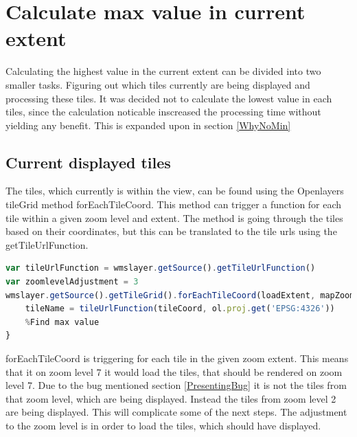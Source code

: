 \section{Calculate max value in current extent}
Calculating the highest value in the current extent can be divided into two smaller tasks. Figuring out which tiles currently are being displayed and processing these tiles. It was decided not to calculate the lowest value in each tiles, since the calculation noticable inscreased the processing time without yielding any benefit. This is expanded upon in section \ref{WhyNoMin}

\subsection{Current displayed tiles}

The tiles, which currently is within the view, can be found using the Openlayers tileGrid method forEachTileCoord. This method can trigger a function for each tile within a given zoom level and extent. 
\citep{forEachTileCoord}
The method is going through the tiles based on their coordinates, but this can be translated to the tile urls using the getTileUrlFunction.
\begin{lstlisting}[language=JavaScript, caption={The JavaScript in the project}, label= VoresJS,escapechar=|]
var tileUrlFunction = wmslayer.getSource().getTileUrlFunction()
var zoomlevelAdjustment = 3
wmslayer.getSource().getTileGrid().forEachTileCoord(loadExtent, mapZoom - zoomlevelAdjustment, function(tileCoord) {
	tileName = tileUrlFunction(tileCoord, ol.proj.get('EPSG:4326'))
	%Find max value
}
\end{lstlisting}
forEachTileCoord is triggering for each tile in the given zoom extent. This means that it on zoom level 7 it would load the tiles, that should be rendered on zoom level 7. Due to the bug mentioned section \ref{PresentingBug} it is not the tiles from that zoom level, which are being displayed. Instead the tiles from zoom level 2 are being displayed. This will complicate some of the next steps. 
The adjustment to the zoom level is in order to load the tiles, which should have displayed.


